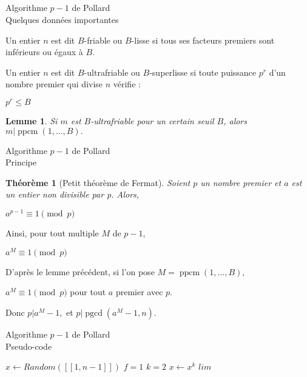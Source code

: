 \documentclass[utf8,10pt,french]{beamer}
\newtheorem{theoreme}{Th{\'e}or{\`e}me}
\newtheorem{lemme}{Lemme}
\DeclareMathOperator{\pgcd}{pgcd}
\DeclareMathOperator{\ppcm}{ppcm}
\begin{document}
\subsection{}
\begin{frame}{Algorithme $p - 1$ de Pollard \\ Quelques données importantes}
\begin{definition}
Un entier $n$ est dit $B$-friable ou $B$-lisse si tous ses facteurs premiers sont inférieurs ou égaux à $B.$
\end{definition} \pause

\begin{definition}
Un entier $n$ est dit $B$-ultrafriable ou $B$-superlisse si toute puissance $p^r$ d’un nombre premier qui divise $n$ vérifie :
\begin{center}
$p^r \leq B$
\end{center}
\end{definition} \pause

\begin{lemme}
Si $m$ est $B$-ultrafriable pour un certain seuil $B$, alors $m | \ppcm(1, ..., B).$
\end{lemme}
\end{frame}

\begin{frame}{Algorithme $p - 1$ de Pollard \\ Principe}
\begin{theoreme}[Petit théorème de Fermat]
Soient $p$ un nombre premier et $a$ est un entier non divisible par p. Alors,
\begin{center}  
$a^{p - 1} \equiv 1 \pmod p$
\end{center}
\end{theoreme} \pause
Ainsi, pour tout multiple $M$ de $p - 1$,
\begin{center}
$a^M \equiv 1 \pmod p$
\end{center} \pause
D'après le lemme précédent, si l'on pose $M = \ppcm(1, ..., B),$
\begin{center}
$a^M \equiv 1 \pmod p$ pour tout $a$ premier avec $p.$
\end{center} \pause
Donc $p | a^M - 1,$ et $p | \pgcd(a^M - 1, n).$
\end{frame}

\begin{frame}{Algorithme $p - 1$ de Pollard \\ Pseudo-code}
\begin{algorithm}[H]
\caption{Factorisation de $n$ par $p-1$ de Pollard}
\BlankLine
$x \gets Random([\![1,n-1]\!])$\;
$f = 1$\;
$k = 2$\;
$x \gets x^k$\;
$lim$\;
\end{algorithm}
\end{frame}
\end{document}
